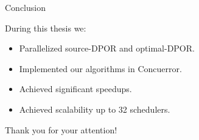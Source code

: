 \documentclass[9pt]{beamer}
\begin{document}
\begin{frame}{Conclusion}

During this thesis we:
\begin{itemize}[<+->]
\item Parallelized source-DPOR and optimal-DPOR.
\item Implemented our algorithms in Concuerror.
\item Achieved significant speedups.
\item Achieved scalability up to 32 schedulers.
\end{itemize}

\end{frame}




\begin{frame}{}

Thank you for your attention!

\end{frame}
\end{document}
